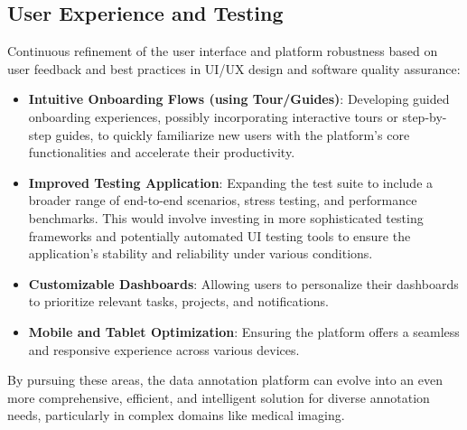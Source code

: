 \subsection{User Experience and Testing}
Continuous refinement of the user interface and platform robustness based on user feedback and best practices in UI/UX design and software quality assurance:
\begin{itemize}
    \item \textbf{Intuitive Onboarding Flows (using Tour/Guides)}: Developing guided onboarding experiences, possibly incorporating interactive tours or step-by-step guides, to quickly familiarize new users with the platform's core functionalities and accelerate their productivity.
    \item \textbf{Improved Testing Application}: Expanding the test suite to include a broader range of end-to-end scenarios, stress testing, and performance benchmarks. This would involve investing in more sophisticated testing frameworks and potentially automated UI testing tools to ensure the application's stability and reliability under various conditions.
    \item \textbf{Customizable Dashboards}: Allowing users to personalize their dashboards to prioritize relevant tasks, projects, and notifications.
    \item \textbf{Mobile and Tablet Optimization}: Ensuring the platform offers a seamless and responsive experience across various devices.
\end{itemize}

By pursuing these areas, the data annotation platform can evolve into an even more comprehensive, efficient, and intelligent solution for diverse annotation needs, particularly in complex domains like medical imaging.
